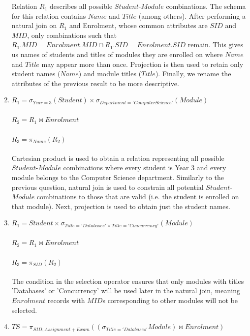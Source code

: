 \documentclass[a4paper]{article}
\begin{document}
\begin{enumerate}
            Relation $R_1$ describes all possible $Student$-$Module$ 
            combinations. 
            The schema for this relation contains $Name$ and 
            $Title$ (among others).
            After performing a natural join on $R_1$ and Enrolment, whose 
            common attributes are $SID$ and $MID$,   
            only combinations such that $R_1.MID = Enrolment.MID 
            \cap R_1.SID = Enrolment.SID$ remain. This gives us names of 
            students and titles of modules they are enrolled on 
            where $Name$ and $Title$ may appear more than once. Projection 
            is then used to retain only student names ($Name$) and module 
            titles ($Title$). Finally, we rename the attributes of the 
            previous result to be more descriptive.   
    \item $ R_1 = \sigma_{Year = 3}(Student) 
            \times \sigma_{Department = 'Computer Science'}(Module) $ \\ \\
      $ R_2 = R_1 \Join Enrolment $ \\ \\
      $ R_3 = \pi_{Name} (R_2) $ \\ \\
            Cartesian product is used to obtain a relation representing all
            possible $Student$-$Module$ combinations where every student is Year 3
            and every module belongs to the Computer Science department.
            Similarly to the previous question, natural join is used to constrain
            all potential $Student$-$Module$ combinations to those that are valid
            (i.e. the student is enrolled on that module). Next, projection is used
            to obtain just the student names.
    \item $ R_1 = Student 
            \times \sigma_{Title = 'Databases' \vee Title = 'Concurrency' }(Module) $ \\ \\
      $ R_2 = R_1 \Join Enrolment $ \\ \\
      $ R_3 = \pi_{SID} (R_2) $ \\ \\
            The condition in the selection operator ensures that only modules with titles
            'Databases' or 'Concurrency' will be used later in the natural join, meaning
            $Enrolment$ records with $MID$s corresponding to other modules will not be 
            selected.
    \item $ TS = \pi_{SID,Assignment + Exam} ((\sigma_{Title = 'Databases'} Module) \Join Enrolment) $ \\ \\

\end{enumerate}
\end{document}
